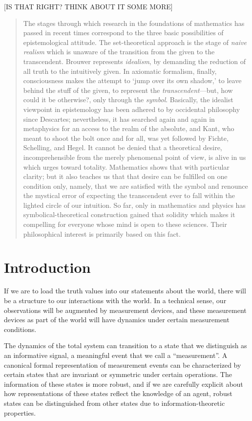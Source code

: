 [IS THAT RIGHT? THINK ABOUT IT SOME MORE]

\begin{quote}
    The stages through which research in the foundations of mathematics has passed in recent times correspond to the three basic possibilities of epistemological attitude.  The set-theoretical approach is the stage of \emph{naive realism} which is unaware of the transition from the given to the transcendent.  Brouwer represents \emph{idealism}, by demanding the reduction of all truth to the intuitively given.  In axiomatic formalism, finally, consciousness makes the attempt to `jump over its own shadow,' to leave behind the stuff of the given, to represent the \emph{transcendent}---but, how could it be otherwise?, only through the \emph{symbol}.  Basically, the idealist viewpoint in epistemology has been adhered to by occidental philosophy since Descartes; nevertheless, it has searched again and again in metaphysics for an access to the realm of the absolute, and Kant, who meant to shoot the bolt once and for all, was yet followed by Fichte, Schelling, and Hegel.  It cannot be denied that a theoretical desire, incomprehensible from the merely phenomenal point of view, is alive in us which urges toward totality. Mathematics shows that with particular clarity; but it also teaches us that that desire can be fulfilled on one condition only, namely, that we are satisfied with the symbol and renounce the mystical error of expecting the transcendent ever to fall within the lighted circle of our intuition.  So far, only in mathematics and physics has symbolical-theoretical construction gained that solidity which makes it compelling for everyone whose mind is open to these sciences.  Their philosophical interest is primarily based on this fact.

    \citep[p. 65-66]{Weyl1949}
\end{quote}




\section{Introduction}

If we are to load the truth values into our statements about the world, there will be a structure to our interactions with the world. In a technical sense, our observations will be augmented by measurement devices, and these measurement devices as part of the world will have dynamics under certain measurement conditions.  

The dynamics of the total system can transition to a state that we distinguish as an informative signal, a meaningful event that we call a ``measurement''.  A canonical formal representation of measurement events can be characterized by certain states that are invariant or symmetric under certain operations.  The information of these states is more robust, and if we are carefully explicit about how representations of these states reflect the knowledge of an agent, robust states can be distinguished from other states due to information-theoretic properties.

